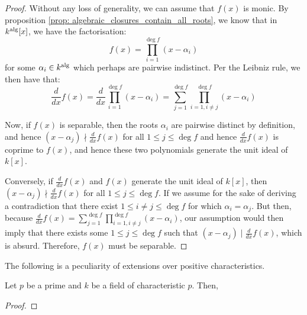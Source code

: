             \begin{proof}
                Without any loss of generality, we can assume that $f(x)$ is monic. By proposition \ref{prop: algebraic_closures_contain_all_roots}, we know that in $k^{\mathrm{alg}}[x]$, we have the factorisation:
                    $$f(x) = \prod_{i = 1}^{\deg f} (x - \alpha_i)$$
                for some $\alpha_i \in k^{\mathrm{alg}}$ which perhaps are pairwise indistinct. Per the Leibniz rule, we then have that:
                    $$\frac{d}{dx} f(x) = \frac{d}{dx} \prod_{i = 1}^{\deg f} (x - \alpha_i) = \sum_{j = 1}^{\deg f} \prod_{i = 1, i \not = j}^{\deg f} (x - \alpha_i)$$

                Now, if $f(x)$ is separable, then the roots $\alpha_i$ are pairwise distinct by definition, and hence $(x - \alpha_j) \nmid \frac{d}{dx} f(x)$ for all $1 \leq j \leq \deg f$ and hence $\frac{d}{dx} f(x)$ is coprime to $f(x)$, and hence these two polynomials generate the unit ideal of $k[x]$.

                Conversely, if $\frac{d}{dx} f(x)$ and $f(x)$ generate the unit ideal of $k[x]$, then $(x - \alpha_j) \nmid \frac{d}{dx} f(x)$ for all $1 \leq j \leq \deg f$. If we assume for the sake of deriving a contradiction that there exist $1 \leq i \not = j \leq \deg f$ for which $\alpha_i = \alpha_j$. But then, because $\frac{d}{dx} f(x) = \sum_{j = 1}^{\deg f} \prod_{i = 1, i \not = j}^{\deg f} (x - \alpha_i)$, our assumption would then imply that there exists some $1 \leq j \leq \deg f$ such that $(x - \alpha_j) \mid \frac{d}{dx} f(x)$, which is absurd. Therefore, $f(x)$ must be separable.
            \end{proof}
        The following is a peculiarity of extensions over positive characteristics. 
        \begin{proposition} \label{prop: purely_inseparable_polynomials}
            Let $p$ be a prime and $k$ be a field of characteristic $p$. Then, 
        \end{proposition}
            \begin{proof}
                
            \end{proof}
        \begin{definition} \label{def: purely_inseparable_extensions}
            
        \end{definition}
        \begin{example} \label{example: perfections_are_purely_inseparable}
            
        \end{example}

